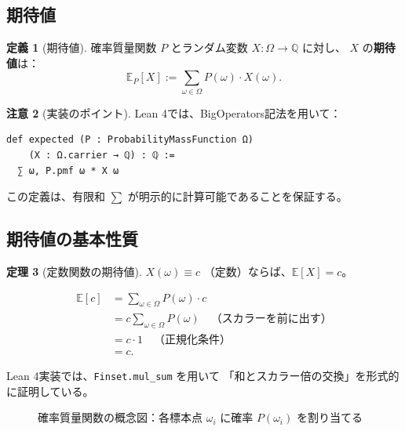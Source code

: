 \documentclass[a4paper,12pt]{ltjsarticle}
\theoremstyle{definition}
\newtheorem{definition}{定義}[section]
\newtheorem{theorem}[definition]{定理}
\newtheorem{remark}[definition]{注意}
\begin{document}
\subsection{期待値}

\begin{definition}[期待値]
確率質量関数 $P$ とランダム変数 $X : \Omega \to \mathbb{Q}$ に対し、
$X$ の\textbf{期待値}は：
\[
  \mathbb{E}_P[X] := \sum_{\omega \in \Omega} P(\omega) \cdot X(\omega).
\]
\end{definition}

\begin{remark}[実装のポイント]
Lean 4では、BigOperators記法を用いて：
\begin{verbatim}
def expected (P : ProbabilityMassFunction Ω)
    (X : Ω.carrier → ℚ) : ℚ :=
  ∑ ω, P.pmf ω * X ω
\end{verbatim}
この定義は、有限和 $\sum$ が明示的に計算可能であることを保証する。
\end{remark}

\subsection{期待値の基本性質}

\begin{theorem}[定数関数の期待値]
$X(\omega) \equiv c$ （定数）ならば、$\mathbb{E}[X] = c$。
\end{theorem}

\begin{proofbox}[証明]
\begin{align*}
  \mathbb{E}[c] &= \sum_{\omega \in \Omega} P(\omega) \cdot c \\
  &= c \sum_{\omega \in \Omega} P(\omega) \quad \text{（スカラーを前に出す）} \\
  &= c \cdot 1 \quad \text{（正規化条件）} \\
  &= c.
\end{align*}

Lean 4実装では、\texttt{Finset.mul\_sum} を用いて
「和とスカラー倍の交換」を形式的に証明している。
\end{proofbox}

\begin{figure}[h]
\centering
{}
\caption{確率質量関数の概念図：各標本点 $\omega_i$ に確率 $P(\omega_i)$ を割り当てる}
\end{figure}
\end{document}
